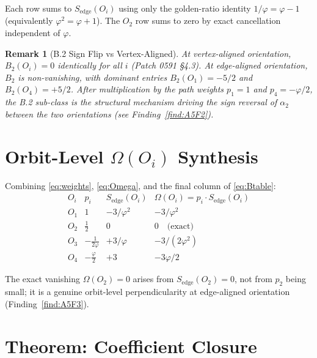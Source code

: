 \documentclass[11pt]{article}
\newtheorem{remark}{Remark}
\begin{document}
Each row sums to $S_{\text{edge}}(O_i)$ using only the golden-ratio
identity $1/\varphi = \varphi - 1$ (equivalently $\varphi^2 = \varphi + 1$).
The $O_2$ row sums to zero by exact cancellation independent of $\varphi$.

\begin{remark}[B.2 Sign Flip vs Vertex-Aligned]\label{rmk:B2flip}
At vertex-aligned orientation, $B_2(O_i) = 0$ identically for all $i$
(Patch 0591 §4.3). At edge-aligned orientation, $B_2$ is non-vanishing,
with dominant entries $B_2(O_1) = -5/2$ and $B_2(O_4) = +5/2$. After
multiplication by the path weights $p_1 = 1$ and $p_4 = -\varphi/2$, the
B.2 sub-class is the structural mechanism driving the sign reversal of
$\alpha_2$ between the two orientations (see Finding~\ref{find:A5F2}).
\end{remark}

\section{Orbit-Level $\Omega(O_i)$ Synthesis}

Combining \eqref{eq:weights}, \eqref{eq:Omega}, and the final column of
\eqref{eq:Btable}:
\begin{equation}
\begin{array}{c|ccc}
O_i & p_i & S_{\text{edge}}(O_i) & \Omega(O_i) = p_i \cdot S_{\text{edge}}(O_i) \\
\hline
O_1 & 1 & -3/\varphi^2 & -3/\varphi^2 \\[2pt]
O_2 & \tfrac{1}{2} & 0 & 0 \quad \text{(exact)} \\[2pt]
O_3 & -\tfrac{1}{2\varphi} & +3/\varphi & -3/(2\varphi^2) \\[2pt]
O_4 & -\tfrac{\varphi}{2} & +3 & -3\varphi/2
\end{array}
\label{eq:Omegatable}
\end{equation}

The exact vanishing $\Omega(O_2) = 0$ arises from $S_{\text{edge}}(O_2)
= 0$, not from $p_2$ being small; it is a genuine orbit-level
perpendicularity at edge-aligned orientation (Finding~\ref{find:A5F3}).

\section{Theorem: Coefficient Closure}
\end{document}
